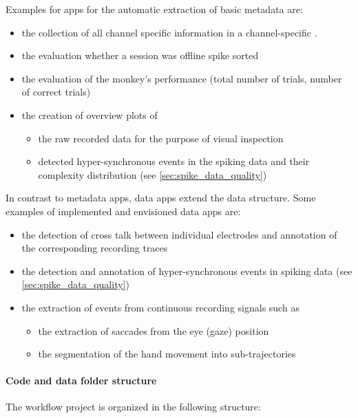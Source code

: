 Examples for apps for the automatic extraction of basic metadata are:
\begin{itemize}
  \setlength{\itemsep}{0pt}
  \setlength{\parskip}{0pt}
  \setlength{\parsep}{0pt}
 \item the collection of all channel specific information in a channel-specific  .
 \item the evaluation whether a session was offline spike sorted
 \item the evaluation of the monkey's performance (total number of trials, number of correct trials)
 \item the creation of overview plots of 
 \begin{itemize}
  \setlength\itemsep{0pt}
  \setlength{\parskip}{0pt}
  \setlength{\parsep}{0pt}
  \item the raw recorded data for the purpose of visual inspection
  \item detected hyper-synchronous events in the spiking data and their complexity distribution (see \cref{sec:spike_data_quality})
 \end{itemize}
\end{itemize}

In contrast to metadata apps, data apps extend the  data structure. Some examples of implemented and envisioned data apps are:
\begin{itemize}
  \setlength{\itemsep}{0pt}
  \setlength{\parskip}{0pt}
  \setlength{\parsep}{0pt}
 \item the detection of cross talk between individual electrodes and annotation of the corresponding recording traces
  \item the detection and annotation of hyper-synchronous events in spiking data (see \cref{sec:spike_data_quality})
 \item the extraction of events from continuous recording signals such as
 \begin{itemize}
  \setlength\itemsep{0pt}
  \setlength{\parskip}{0pt}
  \setlength{\parsep}{0pt}
  \item the extraction of saccades from the eye (gaze) position
  \item the segmentation of the hand movement into sub-trajectories
 \end{itemize}
\end{itemize}


\paragraph{Code and data folder structure}
The workflow project is organized in the following structure:\\

